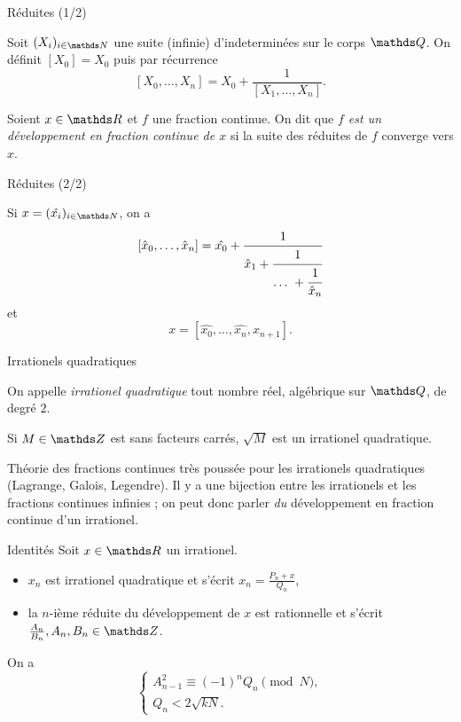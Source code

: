 \begin{frame}{Réduites (1/2)}

\begin{definition}
	Soit $(X_i)_{i\in \N}$ une suite (infinie) d'indeterminées sur le corps
	$\Q$. On définit $[X_0] = X_0$ puis par récurrence \[[X_0, \dots,
	X_n] = X_0 + \frac{1}{[X_1, \dots, X_n]}.\]
\end{definition}

\pause

\begin{definition}
Soient $x\in \R$ et $f$ une fraction continue. On dit que \emph{$f$ est un
développement en fraction continue de $x$} si la suite des réduites de $f$
converge vers $x$.
\end{definition}

\end{frame}

\begin{frame}{Réduites (2/2)}

Si $x = (\hat{x_i})_{i\in \N}$, on a \[[\hat{x}_0, \dots, \hat{x}_n] =
\hat{x_0} + \cfrac{1}{\hat{x}_1 + \cfrac{1}{\dots + \cfrac{1}{\hat{x}_n}}}\]
et \[x = [\hat{x_0}, \dots, \hat{x_n}, x_{n+1}].\]

\end{frame}

\begin{frame}{Irrationels quadratiques}

\begin{definition}
	On appelle \emph{irrationel quadratique} tout nombre réel, algébrique sur
	$\Q$, de degré $2$.
\end{definition}

Si $M\in \Z$ est sans facteurs carrés, $\sqrt{M}$ est un irrationel
quadratique. \vspace{1em}

\pause

Théorie des fractions continues très poussée pour les irrationels quadratiques
(Lagrange, Galois, Legendre). Il y a une bijection entre les irrationels et les
fractions continues infinies ; on peut donc parler \textit{du} développement en
fraction continue d'un irrationel.

\end{frame}

\begin{frame}{Identités}
Soit $x\in \R$ un irrationel.
\begin{itemize}
	\item $x_n$ est irrationel quadratique et s'écrit $x_n = \frac{P_n +
	x}{Q_n}$,
	\item la $n$-ième réduite du développement de $x$ est rationnelle et
	s'écrit $\frac{A_n}{B_n}, A_n, B_n \in \Z$.
\end{itemize}

\pause
\vspace{1em}

On a
\[\begin{cases}
	A_{n-1}^2 \equiv (-1)^n Q_n \pmod{N}, \\
	Q_n < 2\sqrt{kN}.
\end{cases}\]

\end{frame}
